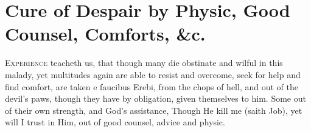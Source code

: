 {%
\section[Cure of Despair]{Cure of Despair by Physic, Good Counsel, Comforts, \&c.}

\lettrine{E}{xperience} teacheth us, that though many die obstinate and wilful in
this malady, yet multitudes again are able to resist and overcome, seek
for help and find comfort, are taken e faucibus Erebi, from the chops
of hell, and out of the devil's paws, though they have by
obligation, given themselves to him. Some out of their own
strength, and God's assistance, Though He kill me (saith Job), yet
will I trust in Him, out of good counsel, advice and physic.

}
